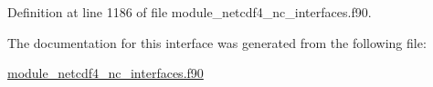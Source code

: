Definition at line 1186 of file module\+\_\+netcdf4\+\_\+nc\+\_\+interfaces.\+f90.



The documentation for this interface was generated from the following file\+:\begin{DoxyCompactItemize}
\item 
\hyperlink{module__netcdf4__nc__interfaces_8f90}{module\+\_\+netcdf4\+\_\+nc\+\_\+interfaces.\+f90}\end{DoxyCompactItemize}
